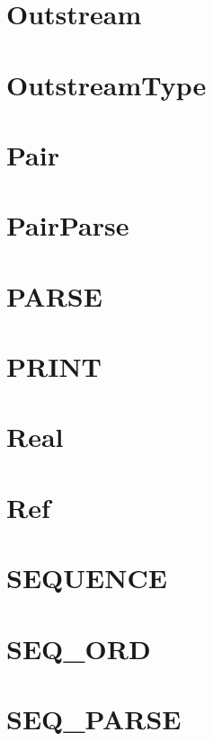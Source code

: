 \newpage
\section{Outstream}


\newpage
\section{OutstreamType}


\newpage
\section{Pair}


\newpage
\section{PairParse}


\newpage
\section{PARSE}


\newpage
\section{PRINT}


\newpage
\section{Real}


\newpage
\section{Ref}


\newpage
\section{SEQUENCE}


\newpage
\section{SEQ\_ORD}


\newpage
\section{SEQ\_PARSE}


